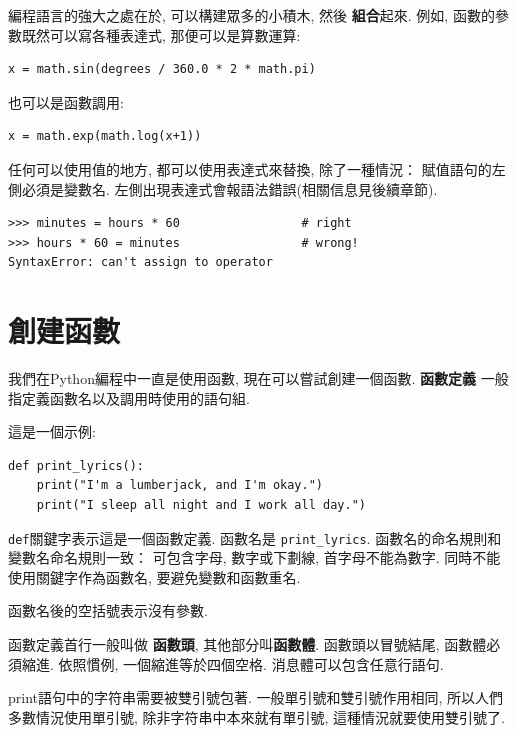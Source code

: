\documentclass[10pt]{book}
\begin{document}
編程語言的強大之處在於, 可以構建眾多的小積木, 然後 {\bf 組合}起來. 
例如, 函數的參數既然可以寫各種表達式, 那便可以是算數運算:

\begin{verbatim}
x = math.sin(degrees / 360.0 * 2 * math.pi)
\end{verbatim}
%
也可以是函數調用:

\begin{verbatim}
x = math.exp(math.log(x+1))
\end{verbatim}
%
任何可以使用值的地方, 都可以使用表達式來替換, 除了一種情況：
賦值語句的左側必須是變數名. 
左側出現表達式會報語法錯誤(相關信息見後續章節). 

\begin{verbatim}
>>> minutes = hours * 60                 # right
>>> hours * 60 = minutes                 # wrong!
SyntaxError: can't assign to operator
\end{verbatim}
%


\section{創建函數}

我們在Python編程中一直是使用函數, 現在可以嘗試創建一個函數. 
{\bf 函數定義} 一般指定義函數名以及調用時使用的語句組. 

這是一個示例:

\begin{verbatim}
def print_lyrics():
    print("I'm a lumberjack, and I'm okay.")
    print("I sleep all night and I work all day.")
\end{verbatim}
%

{\tt def}關鍵字表示這是一個函數定義. 
函數名是 \verb"print_lyrics". 
函數名的命名規則和變數名命名規則一致：
可包含字母, 數字或下劃線, 首字母不能為數字. 
同時不能使用關鍵字作為函數名, 要避免變數和函數重名. 

函數名後的空括號表示沒有參數. 

函數定義首行一般叫做 {\bf 函數頭}, 其他部分叫{\bf 函數體}.
函數頭以冒號結尾, 函數體必須縮進. 
依照慣例, 一個縮進等於四個空格. 
消息體可以包含任意行語句. 

print語句中的字符串需要被雙引號包著. 
一般單引號和雙引號作用相同, 所以人們多數情況使用單引號, 
除非字符串中本來就有單引號, 這種情況就要使用雙引號了. 
\end{document}
